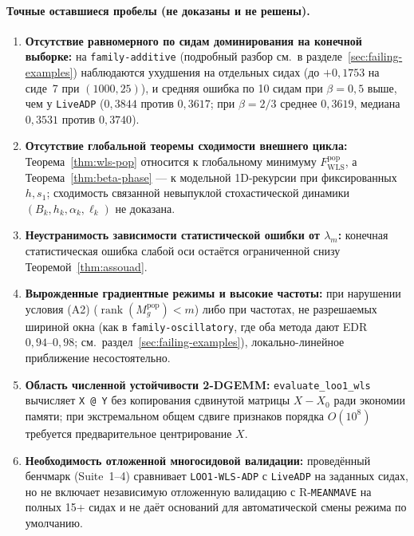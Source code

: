 \documentclass[11pt,a4paper]{article}
\numberwithin{equation}{section}
\theoremstyle{definition}
\theoremstyle{remark}
\newcommand{\rank}{\operatorname{rank}}
\newcommand{\code}[1]{\nolinkurl{#1}}
\begin{document}
\paragraph{Точные оставшиеся пробелы (не доказаны и не решены).}
\begin{enumerate}
  \item \textbf{Отсутствие равномерного по сидам доминирования на конечной выборке:}
  на \texttt{family-additive} (подробный разбор см.\ в разделе~\ref{sec:failing-examples})
  наблюдаются ухудшения на отдельных сидах (до $+0{,}1753$ на сиде~7 при $(1000,25)$),
  и средняя ошибка по 10 сидам при $\beta=0{,}5$ выше, чем у \texttt{LiveADP} ($0{,}3844$ против $0{,}3617$;
  при $\beta=2/3$ среднее $0{,}3619$, медиана $0{,}3531$ против $0{,}3740$).
  \item \textbf{Отсутствие глобальной теоремы сходимости внешнего цикла:}
  Теорема~\ref{thm:wls-pop} относится к глобальному минимуму $F_{\mathrm{WLS}}^{\mathrm{pop}}$,
  а Теорема~\ref{thm:beta-phase} — к модельной 1D-рекурсии при фиксированных $h, s_1$;
  сходимость связанной невыпуклой стохастической динамики $(B_k, h_k, \alpha_k, \ell_k)$ не доказана.
  \item \textbf{Неустранимость зависимости статистической ошибки от $\lambda_m$:}
  конечная статистическая ошибка слабой оси остаётся ограниченной снизу Теоремой~\ref{thm:assouad}.
  \item \textbf{Вырожденные градиентные режимы и высокие частоты:}
  при нарушении условия (A2) ($\rank(M_g^{\mathrm{pop}}) < m$) либо при частотах, не разрешаемых шириной окна
  (как в \texttt{family-oscillatory}, где оба метода дают EDR~$0{,}94\text{--}0{,}98$; см.\ раздел~\ref{sec:failing-examples}),
  локально-линейное приближение несостоятельно.
  \item \textbf{Область численной устойчивости 2-DGEMM:}
  \code{evaluate_loo1_wls} вычисляет \code{X @ Y} без копирования сдвинутой матрицы $X - X_0$ ради экономии памяти;
  при экстремальном общем сдвиге признаков порядка $O(10^8)$ требуется предварительное центрирование $X$.
  \item \textbf{Необходимость отложенной многосидовой валидации:}
  проведённый бенчмарк (Suite~1--4) сравнивает \texttt{LOO1-WLS-ADP} с \texttt{LiveADP} на заданных сидах,
  но не включает независимую отложенную валидацию с R-\texttt{MEANMAVE} на полных 15+ сидах и не даёт оснований
  для автоматической смены режима по умолчанию.
\end{enumerate}

\appendix
\end{document}
